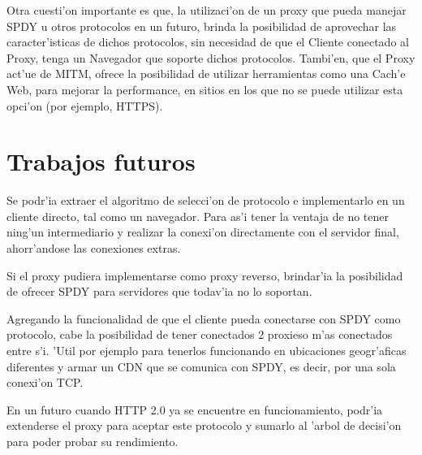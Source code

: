 Otra cuesti'on importante es que, la utilizaci'on de un proxy que pueda manejar SPDY u otros protocolos en un futuro, brinda la posibilidad de aprovechar las caracter'isticas de dichos protocolos, sin necesidad de que el Cliente conectado al Proxy, tenga un Navegador que soporte dichos protocolos. Tambi'en, que el Proxy act'ue de MITM, ofrece la posibilidad de utilizar herramientas como una Cach'e Web, para mejorar la performance, en sitios en los que no se puede utilizar esta opci'on (por ejemplo, HTTPS).

\section{Trabajos futuros}

Se podr'ia extraer el algoritmo de selecci'on de protocolo e implementarlo en un cliente directo, tal como un navegador. Para as'i tener la ventaja de no tener ning'un intermediario y realizar la conexi'on directamente con el servidor final, ahorr'andose las conexiones extras.

Si el proxy pudiera implementarse como proxy reverso, brindar'ia la posibilidad de ofrecer SPDY para servidores que todav'ia no lo soportan.

Agregando la funcionalidad de que el cliente pueda conectarse con SPDY como protocolo, cabe la posibilidad de tener conectados 2 proxieso m'as conectados entre s'i. 'Util por ejemplo para tenerlos funcionando en ubicaciones geogr'aficas diferentes y armar un CDN que se comunica con SPDY, es decir, por una sola conexi'on TCP.

En un futuro cuando HTTP 2.0 ya se encuentre en funcionamiento, podr'ia extenderse el proxy para aceptar este protocolo y sumarlo al 'arbol de decisi'on para poder probar su rendimiento.
